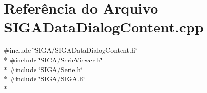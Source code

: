 \section{Referência do Arquivo S\+I\+G\+A\+Data\+Dialog\+Content.\+cpp}
\label{_s_i_g_a_data_dialog_content_8cpp}
{\ttfamily \#include \char`\"{}S\+I\+G\+A/\+S\+I\+G\+A\+Data\+Dialog\+Content.\+h\char`\"{}}\\*
{\ttfamily \#include \char`\"{}S\+I\+G\+A/\+Serie\+Viewer.\+h\char`\"{}}\\*
{\ttfamily \#include \char`\"{}S\+I\+G\+A/\+Serie.\+h\char`\"{}}\\*
{\ttfamily \#include \char`\"{}S\+I\+G\+A/\+S\+I\+G\+A.\+h\char`\"{}}\\*
